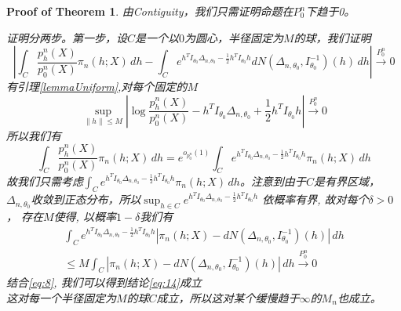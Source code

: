 \documentclass[review]{elsarticle}
\newtheorem{proofOfTheorem}{Proof of Theorem}
\begin{document}
\begin{proofOfTheorem}
    由Contiguity，我们只需证明命题在$P_0^n$下趋于0。

    证明分两步。第一步，设$C$是一个以$0$为圆心，半径固定为$M$的球，我们证明
\begin{equation}\label{eq:14}
    \left|\int_C \frac{p^n_h(X)}{p^n_0(X)}\pi_n (h;X) \, dh-\int_C e^{h^TI_{\theta_0}\Delta_{n,\theta_0}-\frac{1}{2}h^TI_{\theta_0}h}dN(\Delta_{n,\theta_0},I_{\theta_0}^{-1})(h)\, dh\right|
 \xrightarrow{P^n_0}0
\end{equation}
有引理\ref{lemmaUniform},对每个固定的$M$
\begin{equation}
    \sup_{\|h\|\leq M}|\log \frac{p_h^n(X)}{p_0^n(X)}-h^TI_{\theta_0}\Delta_{n,\theta_0}+\frac{1}{2}h^TI_{\theta_0}h|\xrightarrow{P_0^n}0 
\end{equation}
所以我们有
\begin{equation}\label{eq:8}
    \int_C \frac{p_h^n(X)}{p_0^n(X)}\pi_n (h;X) \, dh=e^{o_{p^n_0}(1)}\int_C e^{h^TI_{\theta_0}\Delta_{n,\theta_0}-\frac{1}{2}h^TI_{\theta_0}h}\pi_n (h;X) \, dh
\end{equation}
故我们只需考虑$\int_C e^{h^TI_{\theta_0}\Delta_{n,\theta_0}-\frac{1}{2}h^TI_{\theta_0}h}\pi_n (h;X) \, dh$。注意到由于$C$是有界区域，$\Delta_{n,\theta_0}$收敛到正态分布，所以$\sup_{h\in C}e^{h^TI_{\theta_0}\Delta_{n,\theta_0}-\frac{1}{2}h^TI_{\theta_0}h}$ 依概率有界, 故对每个$\delta>0$， 存在$M$使得, 以概率$1-\delta$我们有
\begin{equation}
\begin{aligned}
    \int_C e^{h^TI_{\theta_0}\Delta_{n,\theta_0}-\frac{1}{2}h^TI_{\theta_0}h}|\pi_n (h;X)-dN(\Delta_{n,\theta_0},I_{\theta_0}^{-1})(h)|\, dh
\\
\leq M\int_C |\pi_n(h;X)-dN(\Delta_{n,\theta_0},I_{\theta_0}^{-1})(h)|\, dh\xrightarrow{P^n_0}0
\end{aligned}
\end{equation}
结合\eqref{eq:8}, 我们可以得到结论\eqref{eq:14}成立 \\

这对每一个半径固定为$M$的球$C$成立，所以这对某个缓慢趋于$\infty$的$M_n$也成立。


\end{proofOfTheorem}
\end{document}
